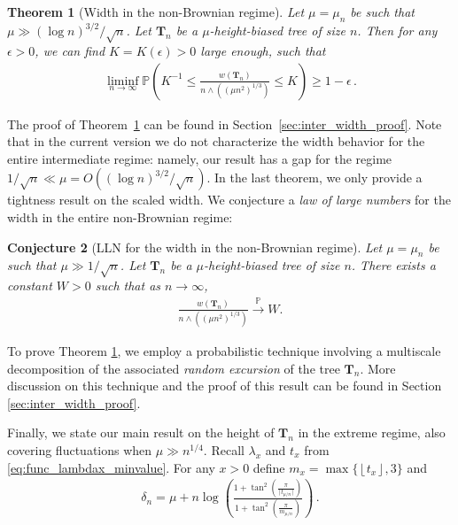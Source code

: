 \documentclass{article}
\newcommand{\pr}{\mathbb{P}}								%
\newcommand{\Prob}[1]{\pr\left(#1\right)}					%
\newcommand{\1}{\mathbbm{1}}								%
\newtheorem{theorem}{Theorem}[section]
\newtheorem{conjecture}[theorem]{Conjecture}
\theoremstyle{definition}
\numberwithin{equation}{section}
\newcommand{\toinp}{\overset{\mathbb P}{\longrightarrow}}
\newcommand{\eps}{\epsilon}
\newcommand{\floor}[1]{\left\lfloor #1\right\rfloor}
\begin{document}
\begin{theorem}[Width in the non-Brownian regime]\label{thm:width}
Let $\mu=\mu_n$ be such that $\mu\gg (\log n)^{3/2}/\sqrt{n}$.
Let $\mathbf{T}_n$ be a $\mu$-height-biased tree of size $n$.
Then for any $\eps>0$, we can find $K=K(\eps)>0$ large enough, such that
        \begin{align*}
            \liminf_{n \to \infty} \Prob{K^{-1}\leq\frac{w(\mathbf{T}_n)}{n\wedge\left((\mu n^2)^{1/3}\right)}\leq K}\geq 1-\eps\,.
        \end{align*}
\end{theorem}
The proof of Theorem~\ref{thm:width} can be found in Section~\ref{sec:inter_width_proof}. Note that in the current version we do not characterize the width behavior for the entire intermediate regime: namely, our result has a gap for the regime $1/\sqrt{n}\ll \mu= O\left((\log n)^{3/2}/\sqrt{n}\right)$. In the last theorem, we only provide a tightness result on the scaled width. We conjecture a \emph{law of large numbers} for the width in the entire non-Brownian regime:
\begin{conjecture}[LLN for the width in the non-Brownian regime]\label{conj:LLN_width}
    Let $\mu=\mu_n$ be such that $\mu\gg1/\sqrt{n}$.
    Let $\mathbf{T}_n$ be a $\mu$-height-biased tree of size $n$.
    There exists a constant $W>0$ such that as $n \to \infty$,
    \begin{align*}
        \frac{w(\mathbf{T}_n)}{n\wedge\left((\mu n^2)^{1/3}\right)} \toinp W.
    \end{align*}
\end{conjecture}


To prove Theorem \ref{thm:width}, we employ a probabilistic technique involving a multiscale decomposition of the associated \emph{random excursion} of the tree $\mathbf{T}_n$. More discussion on this technique and the proof of this result can be found in Section \ref{sec:inter_width_proof}. %

Finally, we state our  main result on the height of $\mathbf{T}_n$ in the extreme regime, also covering fluctuations when $\mu \gg n^{1/4}$. {Recall $\lambda_x$ and $t_x$ from \eqref{eq:func_lambdax_minvalue}. For any $x>0$ define $m_x=\max\{\floor{t_x},3\}$ and
\begin{align}
    \delta_n=\mu+n\log\left(\frac{1+\tan^2\left(\frac{\pi}{\lceil t_{\mu/n}\rceil}\right)}{1+\tan^2\left(\frac{\pi}{m_{\mu/n}}\right)}\right)\,. \label{eq:def_m_n_delta_n}
\end{align}
} 
\end{document}
